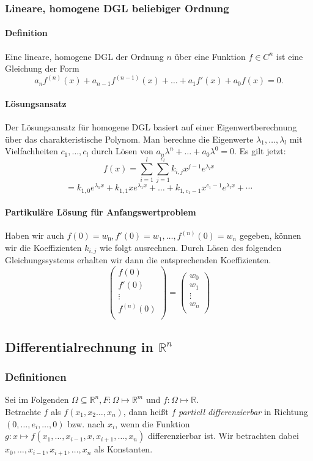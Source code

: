 \documentclass[a4paper, 9pt, DIV=24]{scrartcl}
\newcommand{\R}{\mathbb{R}}
\begin{document}
\subsubsection{Lineare, homogene DGL beliebiger Ordnung}
\paragraph{Definition} Eine lineare, homogene DGL der Ordnung $n$ über eine Funktion $f \in C^{n}$ ist eine Gleichung der Form
\[ a_n f^{(n)}(x) + a_{n-1} f^{(n-1)}(x) + \dots + a_1 f'(x) + a_0 f(x) = 0. \]
\paragraph{Lösungsansatz}
Der Lösungsansatz für homogene DGL basiert auf einer Eigenwertberechnung über das charakteristische Polynom.
Man berechne die Eigenwerte $\lambda_1, \dots, \lambda_l$ mit Vielfachheiten $c_1, \dots, c_l$ durch Lösen von $a_n\lambda^n + \dots + a_0\lambda^0 = 0$.
Es gilt jetzt:
\[ f(x) = \sum_{i=1}^{l}\sum_{j=1}^{c_l}k_{i,j}x^{j-1}e^{\lambda_l x} \]
\[ = k_{1,0}e^{\lambda_1 x} + k_{1,1}xe^{\lambda_1 x} + \dots + k_{1,c_1-1}x^{c_1-1}e^{\lambda_l x} + \cdots \]
\paragraph{Partikuläre Lösung für Anfangswertproblem}
Haben wir auch $f(0) = w_0, f'(0) = w_1, \dots, f^{(n)}(0) = w_n$ gegeben,
können wir die Koeffizienten $k_{i,j}$ wie folgt ausrechnen.
Durch Lösen des folgenden Gleichungssystems erhalten wir dann die entsprechenden Koeffizienten.
\[
 \begin{pmatrix}
  f(0) \\
  f'(0) \\
  \vdots \\
  f^{(n)}(0) \\
 \end{pmatrix}
  =
 \begin{pmatrix}
  w_0 \\
  w_1 \\
  \vdots \\
  w_n \\
 \end{pmatrix}
\]

\clearpage
\subsection{Differentialrechnung in $\mathbb{R}^n$}
\subsubsection{Definitionen}
Sei im Folgenden $\Omega \subseteq \R^n, F: \Omega \mapsto \R^m$ und $f: \Omega \mapsto \R$. \\
Betrachte $f$ als $f(x_1,x_2\dots,x_n)$, dann heißt $f$ \emph{partiell differenzierbar} in Richtung $(0,\dots,e_i,\dots,0)$ bzw. nach $x_i$,
wenn die Funktion $g: x \mapsto f(x_1,\dots,x_{i-1},x,x_{i+1},\dots,x_n)$ differenzierbar ist. Wir betrachten dabei $x_0,\dots,x_{i-1},x_{i+1},\dots,x_n$ als Konstanten.
\end{document}
